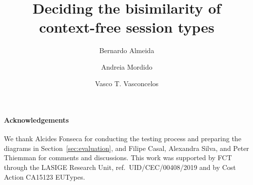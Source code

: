 \documentclass[orivec,runningheads]{llncs}
\begin{document}
\title{Deciding the bisimilarity of context-free session types
}


\author{Bernardo Almeida \and
Andreia Mordido \and
Vasco T. Vasconcelos}

%
%



%
%
%


\maketitle







% 



\paragraph{Acknowledgements}
We thank Alcides Fonseca for conducting the testing process and
preparing the diagrams in Section~\ref{sec:evaluation}, and Filipe
Casal, Alexandra Silva, and Peter Thiemman for comments and discussions.
%
This work was supported by FCT through the LASIGE Research Unit, ref.\
UID/CEC/00408/2019 and by Cost Action CA15123 EUTypes.




%
%
%
%
%
\end{document}
